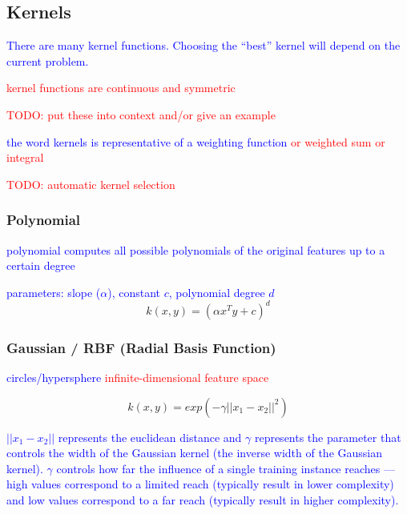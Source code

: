 \subsection{Kernels}

\textcolor{blue}{There are many kernel functions. Choosing the ``best'' kernel will depend on the current problem.}

\textcolor{red}{kernel functions are continuous and symmetric}

\textcolor{red}{TODO: put these into context and/or give an example}

\textcolor{blue}{the word kernels is representative of a weighting function \textcolor{red}{or weighted sum or integral}}



\textcolor{red}{TODO: automatic kernel selection}

\subsubsection{Polynomial}

\textcolor{blue}{polynomial computes all possible polynomials of the original features up to a certain degree}

\textcolor{blue}{parameters: slope ($\alpha$), constant $c$, polynomial degree $d$}
\begin{equation}
{k(x, y) = (\alpha x^T y + c)^d}
\label{eq:kernel_polynomial_eq}
\end{equation}

\subsubsection{Gaussian / RBF (Radial Basis Function)}

\textcolor{blue}{circles/hypersphere}
\textcolor{red}{infinite-dimensional feature space}

\begin{equation}
{k(x, y) = exp(- \gamma || x_1 - x_2 || ^2 ) }
\label{eq:kernel_guassian_rbf_eq}
\end{equation}

\textcolor{blue}{$|| x_1 - x_2 ||$ represents the euclidean distance and $\gamma$ represents the parameter that controls the width of the Gaussian kernel (the inverse width of the Gaussian kernel). $\gamma$ controls how far the influence of a single training instance reaches --- high values correspond to a limited reach (typically result in lower complexity) and low values correspond to a far reach (typically result in higher complexity).}

